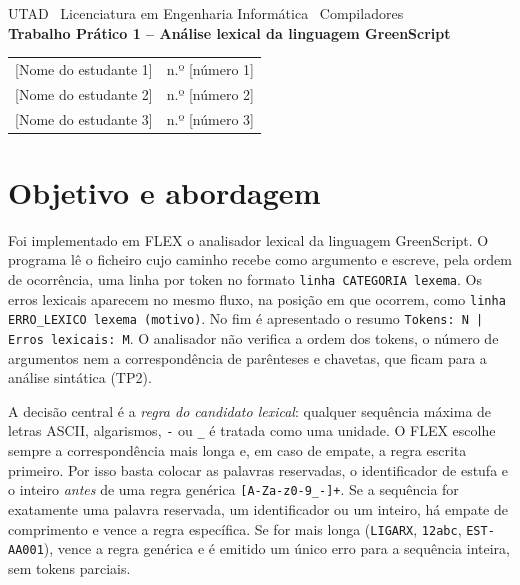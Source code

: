\documentclass[10pt,a4paper]{article}
\newcommand{\tk}[1]{\texttt{#1}}
\begin{document}
\begin{center}
{\small UTAD \textbar\ Licenciatura em Engenharia Informática \textbar\ Compiladores}\\[3pt]
{\Large\bfseries Trabalho Prático 1 -- Análise lexical da linguagem GreenScript}\\[5pt]
\begin{tabular}{ll}
{[Nome do estudante 1]} & n.º {[número 1]}\\
{[Nome do estudante 2]} & n.º {[número 2]}\\
{[Nome do estudante 3]} & n.º {[número 3]}
\end{tabular}
\end{center}

\section{Objetivo e abordagem}
Foi implementado em FLEX o analisador lexical da linguagem GreenScript. O programa lê o ficheiro cujo caminho
recebe como argumento e escreve, pela ordem de ocorrência, uma linha por token no formato
\tk{linha CATEGORIA lexema}. Os erros lexicais aparecem no mesmo fluxo, na posição em que ocorrem, como
\tk{linha ERRO\_LEXICO lexema (motivo)}. No fim é apresentado o resumo \tk{Tokens: N | Erros lexicais: M}.
O analisador não verifica a ordem dos tokens, o número de argumentos nem a correspondência de parênteses e chavetas,
que ficam para a análise sintática (TP2).

A decisão central é a \emph{regra do candidato lexical}: qualquer sequência máxima de letras ASCII, algarismos,
\tk{-} ou \tk{\_} é tratada como uma unidade. O FLEX escolhe sempre a correspondência mais longa e, em caso de empate,
a regra escrita primeiro. Por isso basta colocar as palavras reservadas, o identificador de estufa e o inteiro
\emph{antes} de uma regra genérica \tk{[A-Za-z0-9\_-]+}. Se a sequência for exatamente uma palavra reservada,
um identificador ou um inteiro, há empate de comprimento e vence a regra específica. Se for mais longa (\tk{LIGARX},
\tk{12abc}, \tk{EST-AA001}), vence a regra genérica e é emitido um único erro para a sequência inteira, sem tokens parciais.
\end{document}
